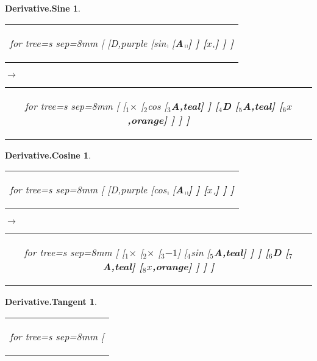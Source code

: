 \documentclass[UTF8,10pt]{ctexart}
\newcommand{\Bigskip}{\bigskip\medskip}
\newcommand{\subtreeA}{\bf A}
\newcommand{\I}{$_{\scriptscriptstyle 1}$}
\newcommand{\II}{$_{\scriptscriptstyle 2}$}
\newcommand{\III}{$_{\scriptscriptstyle 3}$}
\newcommand{\IV}{$_{\scriptscriptstyle 4}$}
\newcommand{\V}{$_{\scriptscriptstyle 5}$}
\newcommand{\VI}{$_{\scriptscriptstyle 6}$}
\newcommand{\VII}{$_{\scriptscriptstyle 7}$}
\newcommand{\VIII}{$_{\scriptscriptstyle 8}$}
\newcommand{\lc}{$_{\:\!\scriptscriptstyle\rm l\!}$}
\newcommand{\rc}{$_{\:\!\scriptscriptstyle\rm r\!}$}
\newcommand{\Derivative}{\rm D}
\newcommand{\x}{$x$}
\newcommand{\NegativeOne}{$-1$}
\newcommand{\Multiplication}{$\times$}
\newcommand{\Sine}{\rm sin}
\newcommand{\Cosine}{\rm cos}
\newtheorem*{Derivative.Sine}{\bf Derivative.Sine }
\newtheorem*{Derivative.Cosine}{\bf Derivative.Cosine }
\newtheorem*{Derivative.Tangent}{\bf Derivative.Tangent }
\begin{document}
	\begin{center}\vspace*{\fill}
		\begin{Derivative.Sine}
			\qquad\par\Bigskip
			\begin{tabular}{c}
				\begin{forest}
					for tree={s sep=8mm}
					[
						[\Derivative,purple
							[\Sine\lc
								[\subtreeA\lc\lc]
							]
							[\x\rc]
						]
					]
				\end{forest}
			\end{tabular}
			\qquad
			$\longrightarrow$
			\qquad
			\begin{tabular}{c}
				\begin{forest}
					for tree={s sep=8mm}
					[
						[\I\Multiplication
							[\II\Cosine
								[\III\subtreeA,teal]
							]
							[\IV\Derivative
								[\V\subtreeA,teal]
								[\VI\x,orange]
							]
						]
					]
				\end{forest}
			\end{tabular}
		\end{Derivative.Sine}
		\bigskip
		\begin{Derivative.Cosine}
			\qquad\par\Bigskip
			\begin{tabular}{c}
				\begin{forest}
					for tree={s sep=8mm}
					[
						[\Derivative,purple
							[\Cosine\lc
								[\subtreeA\lc\lc]
							]
							[\x\rc]
						]
					]
				\end{forest}
			\end{tabular}
			\qquad
			$\longrightarrow$
			\qquad
			\begin{tabular}{c}
				\begin{forest}
					for tree={s sep=8mm}
					[
						[\I\Multiplication
							[\II\Multiplication
								[\III\NegativeOne]
								[\IV\Sine
									[\V\subtreeA,teal]
								]
							]
							[\VI\Derivative
								[\VII\subtreeA,teal]
								[\VIII\x,orange]
							]
						]
					]
				\end{forest}
			\end{tabular}
		\end{Derivative.Cosine}
		\bigskip
		\begin{Derivative.Tangent}
			\qquad\par\Bigskip
			\begin{tabular}{c}
				\begin{forest}
					for tree={s sep=8mm}
					[

\end{forest}
\end{tabular}
\end{Derivative.Tangent}
\end{center}
\end{document}
